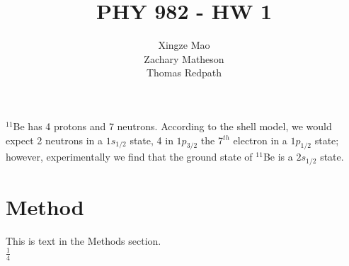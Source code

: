 \documentclass[]{scrartcl}
\title{PHY 982 - HW 1}
\author{Xingze Mao \\ Zachary Matheson \\ Thomas Redpath}
\date{}
\begin{document}
\maketitle

$^{11}$Be has 4 protons and 7 neutrons. According to the shell model, we would expect 2 neutrons in a $1s_{1/2}$ state, 4 in $1p_{3/2}$ the 7$^{th}$ electron in a $1p_{1/2}$ state; however, experimentally we find that the ground state of $^{11}$Be is a $2s_{1/2}$ state.

\section*{Method}\nonumber
This is text in the Methods section.\\
$\frac{1}{4}$\\
\end{document}
